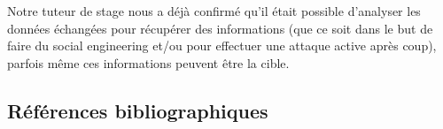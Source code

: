 \documentclass[a4paper, 12pt,twoside]{article}
\begin{document}
		Notre tuteur de stage nous a déjà confirmé qu'il était possible d'analyser les données échangées pour récupérer des informations (que ce soit dans le but de faire du social engineering et/ou pour effectuer une attaque active après coup), parfois même ces informations peuvent être la cible.
		
		\clearpage %
		\subsection{Références bibliographiques}
		{
		\renewcommand{\section}[2]{} %
		\nocite{*}
		
		
		}
\end{document}
